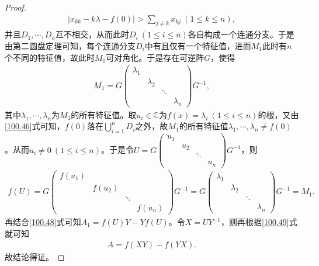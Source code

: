 \documentclass[../../main.tex]{subfiles}%
\begin{document}
\begin{proof}
\begin{align}
|x_{kk} - k\lambda - f(0)| > \sum_{j\ne k} x_{kj}\ (1 \leqslant k \leqslant n), \label{100.46}
\end{align}
并且$D_1, \cdots, D_n$互不相交，从而此时$D_i\ (1 \leqslant i \leqslant n)$各自构成一个连通分支。于是由第二圆盘定理可知，每个连通分支$D_i$中有且仅有一个特征值，进而$M_1$此时有$n$个不同的特征值，故此时$M_1$可对角化。于是存在可逆阵$G$，使得
\begin{align*}
M_1 = G\begin{pmatrix}
\lambda_1 & & & \\
& \lambda_2 & & \\
& & \ddots & \\
& & & \lambda_n
\end{pmatrix}G^{-1},
\end{align*}
其中$\lambda_1, \cdots, \lambda_n$为$M_1$的所有特征值。取$u_i \in \mathbb{C}$为$f(x) = \lambda_i\ (1 \leqslant i \leqslant n)$的根，又由\eqref{100.46}式可知，$f(0)$落在$\bigcup_{i=1}^n D_i$之外，故$M_1$的所有特征值$\lambda_1, \cdots, \lambda_n \ne f(0)$。从而$u_i \ne 0\ (1 \leqslant i \leqslant n)$。于是令$U = G\begin{pmatrix}
u_1 & & & \\
& u_2 & & \\
& & \ddots & \\
& & & u_n
\end{pmatrix}G^{-1}$，则
\begin{align*}
f(U) = G\begin{pmatrix}
f(u_1) & & & \\
& f(u_2) & & \\
& & \ddots & \\
& & & f(u_n)
\end{pmatrix}G^{-1} = G\begin{pmatrix}
\lambda_1 & & & \\
& \lambda_2 & & \\
& & \ddots & \\
& & & \lambda_n
\end{pmatrix}G^{-1} = M_1.
\end{align*}
再结合\eqref{100.48}式可知$A_1 = f(U)Y - Yf(U)$。令$X = UY^{-1}$，则再根据\eqref{100.49}式就可知
\begin{align*}
A = f(XY) - f(YX).
\end{align*}
故结论得证。
\end{proof}
\end{document}
